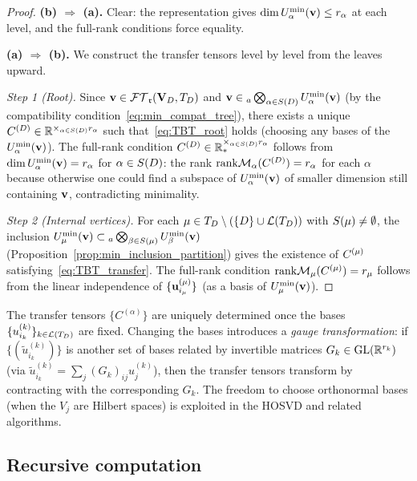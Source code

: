 \begin{proof}
\textbf{(b) $\Rightarrow$ (a).} Clear: the representation gives
$\dim U^{\min}_{\alpha}(\mathbf{v}) \leq r_\alpha$ at each level, and
the full-rank conditions force equality.

\textbf{(a) $\Rightarrow$ (b).} We construct the transfer tensors
level by level from the leaves upward.

\textit{Step 1 (Root).} Since $\mathbf{v} \in \mathcal{FT}_{\mathfrak{r}}(\mathbf{V}_D,T_D)$ and
$\mathbf{v} \in {}_a\bigotimes_{\alpha \in S(D)} U^{\min}_{\alpha}(\mathbf{v})$
(by the compatibility condition~\eqref{eq:min_compat_tree}), there
exists a unique $C^{(D)} \in \mathbb{R}^{\times_{\alpha \in S(D)} r_\alpha}$
such that~\eqref{eq:TBT_root} holds (choosing any bases of the
$U^{\min}_{\alpha}(\mathbf{v})$). The full-rank condition
$C^{(D)} \in \mathbb{R}^{\times_{\alpha \in S(D)} r_\alpha}_*$ follows from
$\dim U^{\min}_{\alpha}(\mathbf{v}) = r_\alpha$ for $\alpha \in S(D)$:
the rank $\mathrm{rank} \mathcal{M}_{\alpha}(C^{(D)}) = r_\alpha$ for each $\alpha$
because otherwise one could find a subspace of $U^{\min}_{\alpha}(\mathbf{v})$
of smaller dimension still containing $\mathbf{v}$, contradicting minimality.

\textit{Step 2 (Internal vertices).} For each $\mu \in T_D \setminus
(\{D\} \cup \mathcal{L}(T_D))$ with $S(\mu) \neq \emptyset$, the inclusion
$U^{\min}_{\mu}(\mathbf{v}) \subset {}_a\bigotimes_{\beta \in S(\mu)}
U^{\min}_{\beta}(\mathbf{v})$ (Proposition~\ref{prop:min_inclusion_partition})
gives the existence of $C^{(\mu)}$ satisfying~\eqref{eq:TBT_transfer}.
The full-rank condition $\mathrm{rank} \mathcal{M}_{\mu}(C^{(\mu)}) = r_\mu$ follows from
the linear independence of $\{\mathbf{u}^{(\mu)}_{i_\mu}\}$
(as a basis of $U^{\min}_{\mu}(\mathbf{v})$).
\end{proof}

\begin{remark}
\label{rem:gauge_freedom}
The transfer tensors $\{C^{(\alpha)}\}$ are uniquely determined once
the bases $\{u^{(k)}_{i_k}\}_{k \in \mathcal{L}(T_D)}$ are fixed. Changing the
bases introduces a \emph{gauge transformation}: if
$\{(\tilde{u}^{(k)}_{i_k})\}$ is another set of bases related by
invertible matrices $G_k \in \mathrm{GL}(\mathbb{R}^{r_k})$ (via
$\tilde{u}^{(k)}_{i_k} = \sum_j (G_k)_{ij} u^{(k)}_j$), then the
transfer tensors transform by contracting with the corresponding
$G_k$. The freedom to choose orthonormal bases (when the $V_j$ are
Hilbert spaces) is exploited in the HOSVD and related algorithms.
\end{remark}

\subsection*{Recursive computation}

